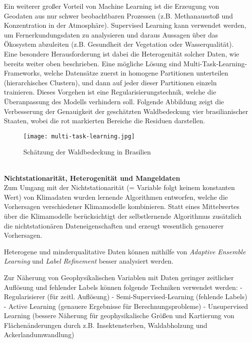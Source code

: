 \documentclass[11pt,ceqn]{book}
\begin{document}
\bigskip
Ein weiterer großer Vorteil von Machine Learning ist die Erzeugung von Geodaten aus nur schwer beobachtbaren Prozessen (z.B. Methanausstoß und Konzentration in der Atmosphäre). Supervised Learning kann verwendet werden, um Fernerkundungsdaten zu analysieren und daraus Aussagen über das Ökosystem abzuleiten (z.B. Gesundheit der Vegetation oder Wasserqualität). Eine besondere Herausforderung ist dabei die Heterogenität solcher Daten, wie bereits weiter oben beschrieben. Eine mögliche Lösung sind Multi-Task-Learning-Frameworks, welche Datensätze zuerst in homogene Partitionen unterteilen (hierarchisches Clustern), und dann auf jeder dieser Partitionen einzeln trainieren. Dieses Vorgehen ist eine Regularisierungstechnik, welche die Überanpassung des Modells verhindern soll. Folgende Abbildung zeigt die Verbesserung der Genauigkeit der geschätzten Waldbedeckung vier brasilianischer Staaten, wobei die rot markierten Bereiche die Residuen darstellen.
\begin{figure}[H]
\centering
\texttt{[image: multi-task-learning.jpg]}
\caption{Schätzung der Waldbedeckung in Brasilien \protect\footnotemark}
\end{figure}
~\\
\bigskip
\textbf{Nichtstationarität, Heterogenität und Mangeldaten}\\
Zum Umgang mit der Nichtstationarität (= Variable folgt keinem konstanten Wert) von Klimadaten wurden lernende Algorithmen entworfen, welche die Vorhersagen verschiedener Klimamodelle kombinieren. Statt eines Mittelwertes über die Klimamodelle berücksichtigt der selbstlernende Algorithmus zusätzlich  die nichtstationären Dateneigenschaften und erzeugt wesentlich genauerer Vorhersagen.

Heterogene und minderqualitative Daten können mithilfe von \textit{Adaptive Ensemble Learning} und \textit{Label Refinement} besser analysiert werden.

Zur Näherung von Geophysikalischen Variablen mit Daten geringer zeitlicher Auflösung und fehlender Labels können folgende Techniken verwendet werden:
- Regularisierer (für zeitl. Auflösung)
- Semi-Supervised-Learning (fehlende Labels)
- Active Learning (genauere Ergebnisse für Berechnungsprobleme)
- Unsupervised Learning (bessere Näherung für geophysikalische Größen und Kartierung von Flächenänderungen durch z.B. Insektensterben, Waldabholzung und Ackerlandumwandlung)\\
\end{document}
